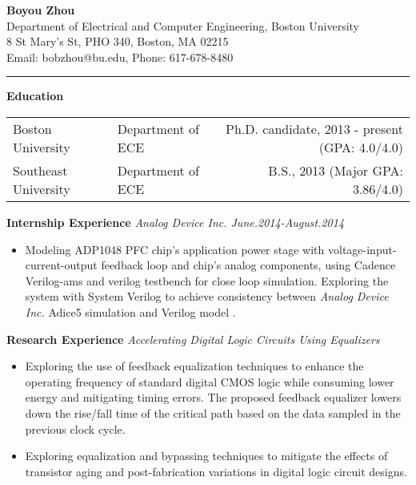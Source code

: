 \documentclass[]{article}
\begin{document}
\pagestyle{empty}
\begin{center}
{\large\textbf{Boyou Zhou}}\\
Department of Electrical and Computer Engineering, Boston University\\
8 St Mary's St, PHO 340, Boston, MA 02215\\
Email: bobzhou@bu.edu, Phone: 617-678-8480\\
\rule[-0.1cm]{7.5in}{0.01cm}
\end{center}
%

\textbf{Education}
\vspace{-0.1in}
\begin{table*}[h]
  \begin{tabular}{p{2.0in}p{2.0in}r}
    Boston University& Department of ECE & Ph.D. candidate, 2013 - present
    (GPA: 4.0/4.0)\\ 
    Southeast University & Department of ECE & B.S., 2013
    (Major GPA: 3.86/4.0)\\ 
  \end{tabular}
  \label{tbl:1}
\end{table*}

\noindent \textbf{Internship Experience}
\textit{Analog Device Inc. June.2014-August.2014}
    \begin{itemize}
        \item Modeling ADP1048 PFC chip's application power stage with
        voltage-input-current-output feedback loop and chip's analog
        components, using Cadence Verilog-ams and verilog testbench for close
        loop simulation.  Exploring the system with System Verilog to achieve
        consistency between \textit{Analog Device Inc.} Adice5 simulation and
        Verilog model . 
    \end{itemize}

\noindent \textbf{Research Experience}
\textit{Accelerating Digital Logic Circuits Using Equalizers}
		\begin{itemize}
            \item Exploring the use of feedback equalization techniques to
            enhance the operating frequency of standard digital CMOS logic
            while consuming lower energy and mitigating timing errors. The
                proposed feedback equalizer lowers down the rise/fall time of
                the critical path based on the data sampled in the previous
                clock cycle. 

            \item Exploring equalization and bypassing techniques to mitigate
            the effects of transistor aging and post-fabrication
            variations in digital logic circuit designs.
		\end{itemize}
\end{document}

